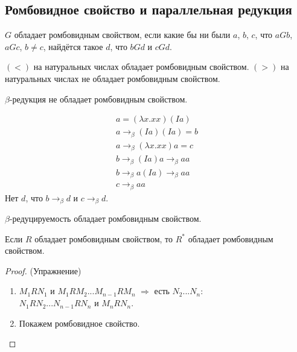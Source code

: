 \subsection{Ромбовидное свойство и параллельная редукция}

\begin{definition}
    $G$ обладает ромбовидным свойством, если какие бы ни были $a$, $b$, $c$, что $aGb$, $aGc$, $b \ne c$, найдётся такое $d$, что $bGd$ и $cGd$.
\end{definition}

\begin{example}
    $(<)$ на натуральных числах обладает ромбовидным свойством.
    $(>)$ на натуральных числах не обладает ромбовидным свойством.
\end{example}

$\beta$-редукция не обладает ромбовидным свойством.
\begin{example} %
    \begin{gather*}
        a = (\lambda x . x x)(Ia) \\
        a \rightarrow_{\beta} (Ia)(Ia) = b\\
        a \rightarrow_{\beta} (\lambda x . x x) a = c \\
        b \rightarrow_{\beta} (Ia)a \rightarrow_{\beta} aa \\
        b \rightarrow_{\beta} a(Ia) \rightarrow_{\beta} aa \\
        c \rightarrow_{\beta} aa
    \end{gather*}
    Нет $d$, что $b \rightarrow_{\beta} d$ и $c \rightarrow_{\beta} d$.
\end{example}

\begin{theorem} \label{church-rosser}
    $\beta$-редуцируемость обладает ромбовидным свойством.
\end{theorem}

\begin{lemma}
    Если $R$ обладает ромбовидным свойством, то $R^{*}$ обладает ромбовидным свойством.
\end{lemma}

\begin{proof} (Упражнение) \todo %
    \begin{enumerate}
        \item $M_{1}RN_{1}$ и $M_{1}RM_{2}...M_{n-1}RM_{n}$ $\Rightarrow$ есть $N_{2}...N_{n}$: \\
            $N_{1}RN_{2}...N_{n-1}RN_{n}$ и $M_{n}RN_{n}$.
        \item Покажем ромбовидное свойство.
        \qedhere
    \end{enumerate}
\end{proof}

